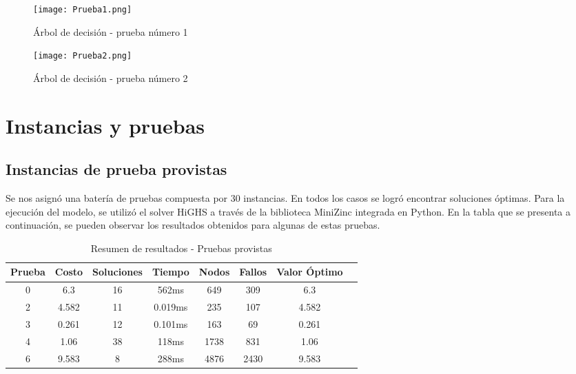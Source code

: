 \vspace{0.7cm}

\begin{figure}[H]
\centering
\texttt{[image: Prueba1.png]}
\caption{Árbol de decisión - prueba número 1}
\end{figure}

\vspace{0.5cm}

\begin{figure}[H]
\centering
\texttt{[image: Prueba2.png]}
\caption{Árbol de decisión - prueba número 2}
\end{figure}

\vspace{0.5cm}


\section{Instancias y pruebas}

\subsection{Instancias de prueba provistas}
Se nos asignó una batería de pruebas compuesta por 30 instancias. En todos los casos se logró encontrar soluciones óptimas. Para la ejecución del modelo, se utilizó el solver HiGHS a través de la biblioteca MiniZinc integrada en Python. En la tabla que se presenta a continuación, se pueden observar los resultados obtenidos para algunas de estas pruebas.
\begin{table}[H]
\centering
\caption{Resumen de resultados - Pruebas provistas}
\begin{tabular}{|c|c|c|c|c|c|c|c|}
\hline
\rowcolor{gray!30}
\textbf{Prueba} & \textbf{Costo} & \textbf{Soluciones} & \textbf{Tiempo} & \textbf{Nodos} & \textbf{Fallos} & \textbf{Valor Óptimo} \\
\hline
0   &  6.3 & 16   & 562ms  & 649   & 309   & 6.3 \\
2     & 4.582  &  11 & 0.019ms  &  235 & 107  & 4.582 \\
3   &  0.261 &  12  & 0.101ms &  163  &   69   & 0.261 \\
4   & 1.06 & 38  & 118ms  & 1738 & 831  & 1.06 \\
6  & 9.583 & 8 &  288ms  &  4876 &  2430  & 9.583   \\
\hline
\end{tabular}
\end{table}


